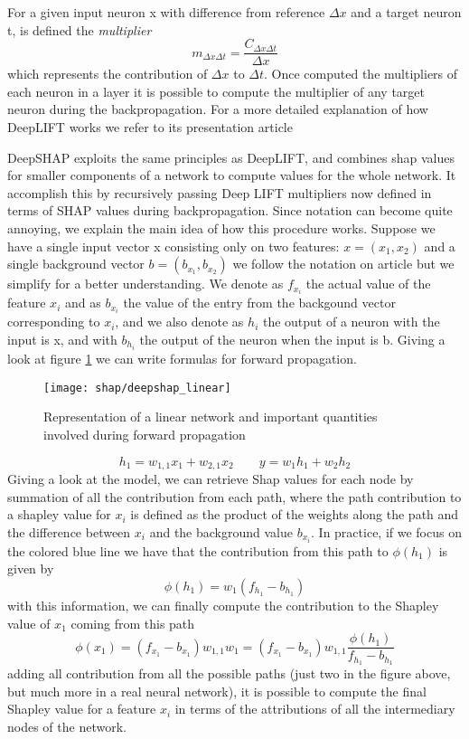 \documentclass[11pt]{report}
\begin{document}
For a given input neuron x with difference from reference $\Delta x$ and a target neuron t, is defined the \emph{multiplier}
\[
m_{\Delta x \Delta t} = \frac{C_{\Delta x \Delta t}}{\Delta x}
\]
which represents the contribution of $\Delta x$ to $\Delta t$. Once computed the multipliers of each neuron in a layer it is possible to compute the multiplier of any target neuron during the backpropagation.
For a more detailed explanation of how DeepLIFT works we refer to its presentation article \cite{shrikumar-2017}

DeepSHAP exploits the same principles as DeepLIFT, and combines shap values for smaller components of a network to compute values for the whole network. It accomplish this by recursively passing Deep LIFT multipliers now defined in terms of SHAP values during backpropagation.
Since notation can become quite annoying, we explain the main idea of how this procedure works.
Suppose we have a single input vector x consisting only on two features: $x = (x_1, x_2)$ and a single background vector $b = (b_{x_1}, b_{x_2})$ we follow the notation on article \cite{chen2019} but we simplify for a better understanding.
We denote as $f_{x_i}$ the actual value of the feature $x_i$ and as $b_{x_i}$ the value of the entry from the backgound vector corresponding to $x_i$, and we also denote as $h_i$ the output of a neuron with the input is x, and with $b_{h_i}$ the output of the neuron when the input is b.
Giving a look at figure \ref{fig:deepshap_linear} we can write formulas for forward propagation.

\begin{figure}[h!]
\centering
\texttt{[image: shap/deepshap\_linear]}
\caption{Representation of a linear network and important quantities involved during forward propagation}
\label{fig:deepshap_linear}
\end{figure}


\[
h_1 = w_{1, 1}x_1 + w_{2, 1}x_2 \qquad y = w_1 h_1 + w_2 h_2
\]
Giving a look at the model, we can retrieve Shap values for each node by summation of all the contribution from each path, where the path contribution to a shapley value for $x_i$ is defined as the product of the weights along the path and the difference between $x_i$ and the background value $b_{x_i}$.
In practice, if we focus on the colored blue line we have that the contribution from this path to $\phi(h_1)$ is given by
\[
\phi(h_1) = w_1 (f_{h_1} - b_{h_1})
\]
with this information, we can finally compute the contribution to the Shapley value of $x_1$ coming from this path
\begin{equation}
\phi(x_1) = (f_{x_1} - b_{x_1}) w_{1, 1} w_1 = (f_{x_1} - b_{x_1}) w_{1, 1} \frac{\phi(h_1)}{f_{h_1} - b_{h_1}}
\end{equation}
adding all contribution from all the possible paths (just two in the figure above, but much more in a real neural network), it is possible to compute the final Shapley value for a feature $x_i$ in terms of the attributions of all the intermediary nodes of the network.
\end{document}
